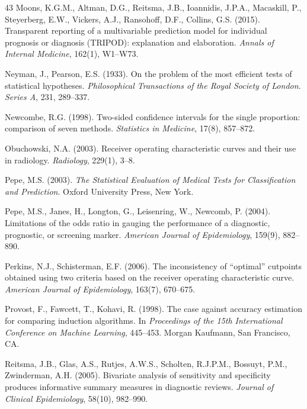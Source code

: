 \documentclass[11pt]{article}
\begin{document}
\begin{thebibliography}{43}
Moons, K.G.M., Altman, D.G., Reitsma, J.B., Ioannidis, J.P.A., Macaskill,
P., Steyerberg, E.W., Vickers, A.J., Ransohoff, D.F., Collins, G.S. (2015).
Transparent reporting of a multivariable prediction model for individual
prognosis or diagnosis (TRIPOD): explanation and elaboration.
\textit{Annals of Internal Medicine}, 162(1), W1--W73.

Neyman, J., Pearson, E.S. (1933).
On the problem of the most efficient tests of statistical hypotheses.
\textit{Philosophical Transactions of the Royal Society of London.
Series A}, 231, 289--337.

Newcombe, R.G. (1998).
Two-sided confidence intervals for the single proportion: comparison of
seven methods.
\textit{Statistics in Medicine}, 17(8), 857--872.

Obuchowski, N.A. (2003).
Receiver operating characteristic curves and their use in radiology.
\textit{Radiology}, 229(1), 3--8.

Pepe, M.S. (2003).
\textit{The Statistical Evaluation of Medical Tests for Classification and
Prediction}.
Oxford University Press, New York.

Pepe, M.S., Janes, H., Longton, G., Leisenring, W., Newcomb, P. (2004).
Limitations of the odds ratio in gauging the performance of a diagnostic,
prognostic, or screening marker.
\textit{American Journal of Epidemiology}, 159(9), 882--890.

Perkins, N.J., Schisterman, E.F. (2006).
The inconsistency of ``optimal'' cutpoints obtained using two criteria
based on the receiver operating characteristic curve.
\textit{American Journal of Epidemiology}, 163(7), 670--675.

Provost, F., Fawcett, T., Kohavi, R. (1998).
The case against accuracy estimation for comparing induction algorithms.
In \textit{Proceedings of the 15th International Conference on Machine
Learning}, 445--453. Morgan Kaufmann, San Francisco, CA.

Reitsma, J.B., Glas, A.S., Rutjes, A.W.S., Scholten, R.J.P.M., Bossuyt,
P.M., Zwinderman, A.H. (2005).
Bivariate analysis of sensitivity and specificity produces informative
summary measures in diagnostic reviews.
\textit{Journal of Clinical Epidemiology}, 58(10), 982--990.


\end{thebibliography}
\end{document}
